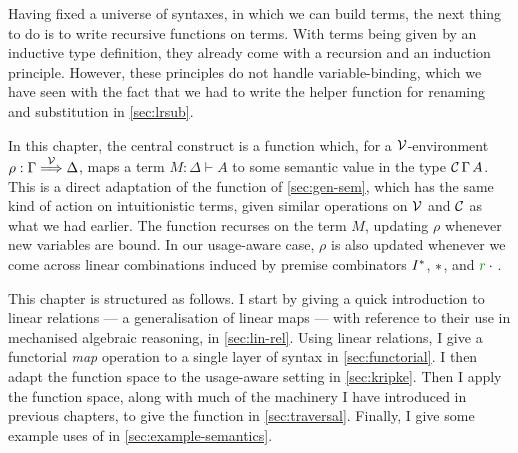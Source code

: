 Having fixed a universe of syntaxes, in which we can build terms, the next thing
to do is to write recursive functions on terms.
With terms being given by an inductive  type definition, they
already come with a recursion and an induction principle.
However, these principles do not handle variable-binding, which we have seen
with the fact that we had to write the  helper
function for renaming and substitution in \cref{sec:lrsub}.

In this chapter, the central construct is a function 
which, for a $\mathcal V$-environment $\rho : \Gamma \stackrel{\mathcal V}\Longrightarrow \Delta$,
maps a term $M : \Delta \vdash A$ to some semantic value in the type
$\mathcal C\,\Gamma\,A$.
This is a direct adaptation of the  function of
\cref{sec:gen-sem}, which has the same kind of action on intuitionistic terms,
given similar operations on $\mathcal V$ and $\mathcal C$ as what we had earlier.
The  function recurses on the term $M$, updating $\rho$
whenever new variables are bound.
In our usage-aware case, $\rho$ is also updated whenever we come across linear
combinations induced by premise combinators $I^{\mathbin{*}}$, $\mathbin{*}$, and
$\gr r \cdot {}$.

This chapter is structured as follows.
I start by giving a quick introduction to linear relations --- a generalisation
of linear maps --- with reference to their use in mechanised algebraic
reasoning, in \cref{sec:lin-rel}.
Using linear relations, I give a functorial \emph{map} operation to a single
layer of syntax in \cref{sec:functorial}.
I then adapt the  function space to the usage-aware
setting in \cref{sec:kripke}.
Then I apply the  function space, along with much of the
machinery I have introduced in previous chapters, to give the
 function in \cref{sec:traversal}.
Finally, I give some example uses of  in
\cref{sec:example-semantics}.




